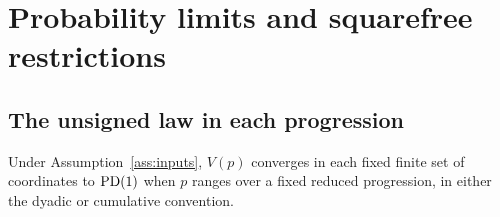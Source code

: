 \section{Probability limits and squarefree restrictions}\label{sec:probability}

\subsection{The unsigned law in each progression}

\begin{proposition}\label{prop:unsigned}
Under Assumption~\ref{ass:inputs}, $V(p)$ converges in each fixed
finite set of coordinates to $\operatorname{PD}(1)$ when $p$ ranges over a fixed
reduced progression, in either the dyadic or cumulative convention.
\end{proposition}

